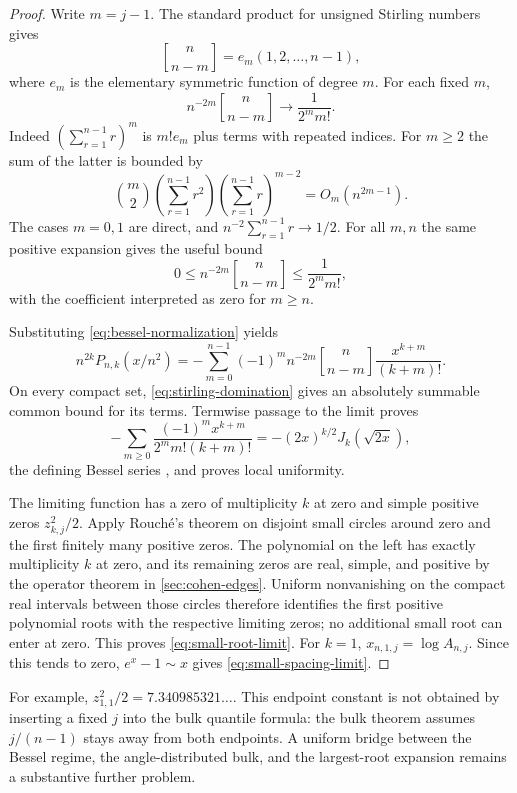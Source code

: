 \documentclass[11pt]{article}
\numberwithin{equation}{section}
\theoremstyle{definition}
\theoremstyle{remark}
\newcommand{\stirling}[2]{\genfrac{[}{]}{0pt}{}{#1}{#2}}
\begin{document}
\begin{proof}
Write $m=j-1$. The standard product for unsigned Stirling numbers gives
\[
 \stirling{n}{n-m}=e_m(1,2,\ldots,n-1),
\]
where $e_m$ is the elementary symmetric function of degree $m$.
For each fixed $m$,
\begin{equation}\label{eq:stirling-fixed-codimension}
 n^{-2m}\stirling{n}{n-m}
           \longrightarrow \frac1{2^m m!}.
\end{equation}
Indeed $(\sum_{r=1}^{n-1}r)^m$ is $m!e_m$ plus terms with repeated
indices. For $m\geq2$ the sum of the latter is bounded by
\[
 \binom m2\left(\sum_{r=1}^{n-1}r^2\right)
          \left(\sum_{r=1}^{n-1}r\right)^{m-2}
       =O_m(n^{2m-1}).
\]
The cases $m=0,1$ are direct, and
$n^{-2}\sum_{r=1}^{n-1}r\to1/2$.
For all $m,n$ the same positive expansion gives the useful bound
\begin{equation}\label{eq:stirling-domination}
 0\leq n^{-2m}\stirling{n}{n-m}
       \leq\frac1{2^m m!},
\end{equation}
with the coefficient interpreted as zero for $m\geq n$.

Substituting \eqref{eq:bessel-normalization} yields
\[
 n^{2k}P_{n,k}(x/n^2)
  =-\sum_{m=0}^{n-1}(-1)^m
       n^{-2m}\stirling{n}{n-m}\frac{x^{k+m}}{(k+m)!}.
\]
On every compact set, \eqref{eq:stirling-domination} gives an
absolutely summable common bound for its terms. Termwise passage to
the limit proves
\[
 -\sum_{m\geq0}\frac{(-1)^m x^{k+m}}{2^m m!(k+m)!}
       =-(2x)^{k/2}J_k(\sqrt{2x}),
\]
the defining Bessel series \cite{DLMFBessel}, and proves local uniformity.

The limiting function has a zero of multiplicity $k$ at zero and
simple positive zeros $z_{k,j}^2/2$. Apply Rouch\'e's theorem on
disjoint small circles around zero and the first finitely many positive
zeros. The polynomial on the left has exactly multiplicity $k$ at
zero, and its remaining zeros are real, simple, and positive by the
operator theorem in \cref{sec:cohen-edges}. Uniform nonvanishing on
the compact real intervals between those circles therefore identifies
the first positive polynomial roots with the respective limiting
zeros; no additional small root can enter at zero. This proves
\eqref{eq:small-root-limit}. For $k=1$, $x_{n,1,j}=\log A_{n,j}$.
Since this tends to zero, $e^x-1\sim x$ gives
\eqref{eq:small-spacing-limit}.
\end{proof}

For example, $z_{1,1}^2/2=7.340985321\ldots$. This endpoint constant
is not obtained by inserting a fixed $j$ into the bulk quantile formula:
the bulk theorem assumes $j/(n-1)$ stays away from both endpoints.
A uniform bridge between the Bessel regime, the angle-distributed
bulk, and the largest-root expansion remains a substantive further
problem.
\end{document}

